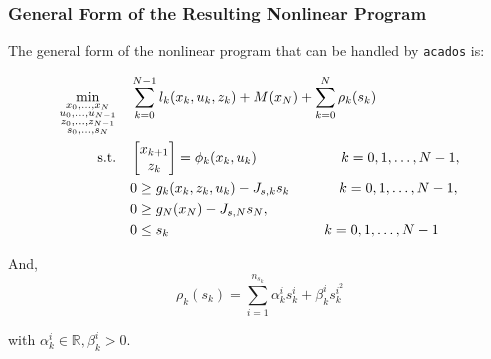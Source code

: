 \documentclass{thesisbeamer}
\newcommand\Fontvi{\fontsize{9}{10}\selectfont}
\begin{document}
\begin{frame}
	\frametitle{General Form of the Resulting Nonlinear Program}
	\Fontvi
	
	The general form of the nonlinear program that can be handled by \texttt{acados} is:

    \begin{equation}\label{NLP}
        \begin{aligned}
        \min_{\substack{x_0,\ldots,x_N\\ u_0,\ldots, u_{N-1} \\ z_0,\ldots, z_{N-1}\\  s_0, \ldots, s_N}} \quad & \sum_{k=0}^{N-1}{l_k(x_k, u_k, z_k) + M(x_N) + \sum_{k=0}^N \rho_k(s_k)}\\
        \textrm{s.t.} \quad & \begin{bmatrix}
                                x_{k+1}\\
                                z_k\\
                                \end{bmatrix} = \phi_k(x_k, u_k) \text{ \hspace{2cm}} k=0,1, \ldots, N-1, \\
                            & 0 \geq g_k(x_k, z_k, u_k) - J_{s,k}s_k \text{\hspace{1.25cm}} k=0,1, \ldots, N-1, \\
                            & 0 \geq g_N(x_N) - J_{s,N}s_N, \\
                            & 0 \leq s_k \text{\hspace{3.9cm}} k=0,1, \ldots, N-1
        \end{aligned}
    \end{equation}
    
    And, 
    \begin{equation}
	\rho_k(s_k) = \sum_{i=1}^{n_{s_k}} \alpha_k^i s_k^i + \beta_k^i s_k^{i^2}
\end{equation}

with $\alpha_k^i \in \mathbb{R}, \beta_k^i > 0$.
\end{frame}
\end{document}
